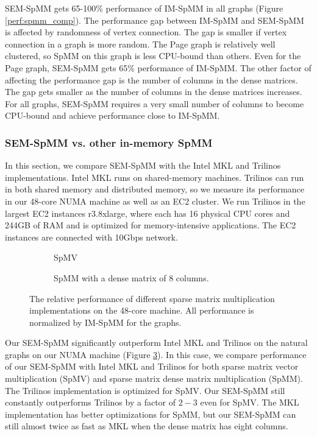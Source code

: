SEM-SpMM gets 65-100\% performance of IM-SpMM in all graphs (Figure
\ref{perf:spmm_comp}). The performance gap between IM-SpMM and SEM-SpMM
is affected by randomness of vertex connection. The gap is smaller if
vertex connection in a graph is more random. The Page graph is relatively
well clustered, so SpMM on this graph is less CPU-bound than others.
Even for the Page graph, SEM-SpMM gets 65\% performance of IM-SpMM.
The other factor of affecting the performance gap is the number of columns
in the dense matrices. The gap gets smaller as the number of columns in
the dense matrices increases. For all graphs, SEM-SpMM requires a very small
number of columns to become CPU-bound and achieve performance close to IM-SpMM.

\subsubsection{SEM-SpMM vs. other in-memory SpMM}
In this section, we compare SEM-SpMM with the Intel MKL and Trilinos
implementations. Intel MKL runs on shared-memory machines. Trilinos can run in
both shared memory and distributed memory, so we measure its performance in
our 48-core NUMA machine as well as an EC2 cluster. We run Trilinos in the largest
EC2 instances r3.8xlarge, where each has 16 physical CPU cores and 244GB of RAM
and is optimized for memory-intensive applications. The EC2 instances are
connected with 10Gbps network.

\begin{figure}
	\footnotesize
	\centering
	\begin{subfigure}[b]{0.5\textwidth}
		\centering
		
		\vspace{-10pt}
		\caption{SpMV}
		\label{perf:spmv}
	\end{subfigure}
	\begin{subfigure}[b]{0.5\textwidth}
		\centering
		
		\vspace{-10pt}
		\caption{SpMM with a dense matrix of 8 columns.}
		\label{perf:spmm8}
	\end{subfigure}
	\vspace{3pt}
	\caption{The relative performance of different sparse matrix multiplication
		implementations on the 48-core machine. All performance is normalized by
	IM-SpMM for the graphs.}
	\label{perf:spmm}
\end{figure}

Our SEM-SpMM significantly outperform Intel MKL and Trilinos on the natural
graphs on our NUMA machine (Figure \ref{perf:spmm}). In this case, we compare
performance of our SEM-SpMM with Intel MKL and Trilinos for both sparse matrix
vector multiplication (SpMV) and sparse matrix dense matrix multiplication (SpMM).
The Trilinos implementation is optimized for SpMV. Our SEM-SpMM still
constantly outperforms Trilinos by a factor of $2-3$ even for SpMV. The MKL
implementation has better optimizations for SpMM, but our SEM-SpMM can still
almost twice as fast as MKL when the dense matrix has eight columns.

